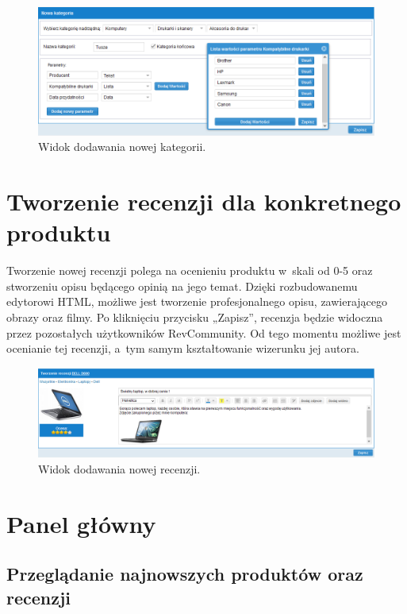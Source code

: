 \begin{figure}[h]
	\centering
	\includegraphics[width=1.00\textwidth]{images/nowa_kategoria.PNG}
	\caption{Widok dodawania nowej kategorii.}
\end{figure}
\newpage

\section{Tworzenie recenzji dla konkretnego produktu}

Tworzenie nowej recenzji polega na ocenieniu produktu w~skali od 0-5 oraz stworzeniu opisu będącego opinią na jego temat. Dzięki rozbudowanemu edytorowi HTML, możliwe jest tworzenie profesjonalnego opisu, zawierającego obrazy oraz filmy. Po kliknięciu przycisku „Zapisz”, recenzja będzie widoczna przez pozostałych użytkowników RevCommunity. Od tego momentu możliwe jest ocenianie tej recenzji, a~tym samym kształtowanie wizerunku jej autora.

\begin{figure}[h]
	\centering
	\includegraphics[width=1.00\textwidth]{images/nowa_recenzja.PNG}
	\caption{Widok dodawania nowej recenzji.}
\end{figure}

\section{Panel główny}

\subsection{Przeglądanie najnowszych produktów oraz recenzji}

